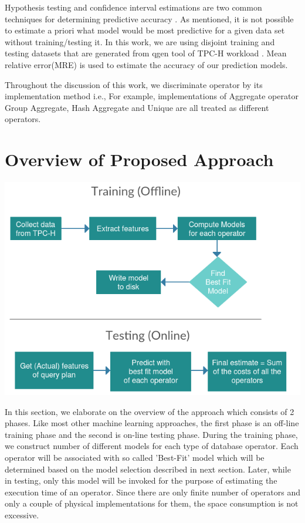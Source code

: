 \documentclass{article}
\begin{document}
\begin{multicols}{2}
	Hypothesis testing and confidence interval estimations are two common
techniques for determining predictive accuracy \cite{forecasting}. As mentioned, 
it is not possible to estimate a priori what model would be
most predictive for a given data set without training/testing it. In this work, we are using
disjoint training and testing datasets that are generated from qgen tool of TPC-H workload 		\cite{TPCH}. Mean relative error(MRE) is used to estimate the accuracy of our prediction models.

Throughout the discussion of this work, we discriminate operator by its implementation method i.e., For example, implementations of Aggregate operator Group Aggregate, Hash Aggregate and Unique are all treated as different operators.

	\section{Overview of Proposed Approach}
	
	\includegraphics[scale=0.4]{training.png}

	In this section, we elaborate on the overview of the approach which consists of 2 phases. Like 
	most other machine learning approaches, the first phase is an off-line training phase and the 
	second is on-line testing phase.
	During the training phase, we construct number of different 
	models for each type of database operator. Each operator will be associated with so called 'Best-Fit' 		model which will be determined 
	based on the model selection described in next section. Later, while in testing, only this model will 		be invoked for the purpose of estimating the execution time of an operator. Since there are 			only finite number of operators and only a couple of physical implementations for them, the space 			consumption is not excessive. 


\end{multicols}
\end{document}
